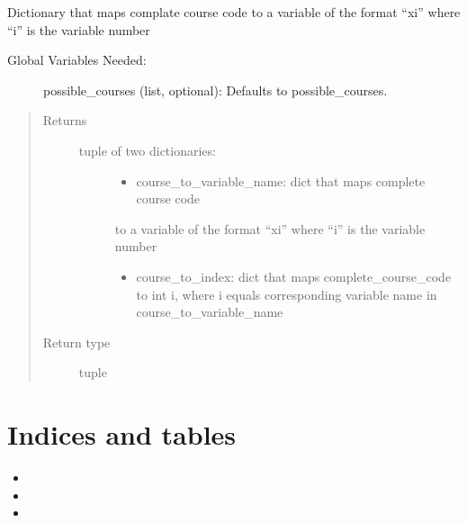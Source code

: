 \documentclass[letterpaper,10pt,english]{sphinxmanual}
\begin{document}

\begin{fulllineitems}
\label{\detokenize{index:optimizer.course_code_to_variable_and_index}}
Dictionary that maps complate course code to a variable of the format
“xi” where “i” is the variable number
\begin{description}
\item[{Global Variables Needed:}] \leavevmode
possible\_courses (list, optional): Defaults to possible\_courses.

\end{description}
\begin{quote}\begin{description}
\item[{Returns}] \leavevmode
\begin{description}
\item[{tuple of two dictionaries:}] \leavevmode\begin{itemize}
\item {} 
course\_to\_variable\_name: dict that maps complete course code

\end{itemize}

to a variable of the format “xi” where “i” is the variable
number
\begin{itemize}
\item {} 
course\_to\_index: dict that maps complete\_course\_code to int i,
where i equals corresponding variable name in
course\_to\_variable\_name

\end{itemize}

\end{description}


\item[{Return type}] \leavevmode
tuple

\end{description}\end{quote}

\end{fulllineitems}



\chapter{Indices and tables}
\label{\detokenize{index:indices-and-tables}}\begin{itemize}
\item {} 

\item {} 

\item {} 

\end{itemize}
\end{document}
